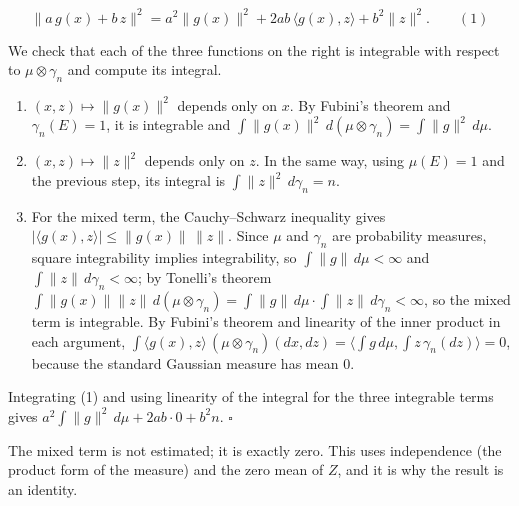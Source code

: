 \documentclass[11pt,a4paper]{report}
\begin{document}
\[\|a\,g(x)+b\,z\|^2=a^2\|g(x)\|^2+2ab\,\langle g(x),z\rangle+b^2\|z\|^2.\qquad(1)\]


We check that each of the three functions on the right is integrable with respect to \(\mu\otimes\gamma_n\) and compute its integral.



\begin{enumerate}


\item \((x,z)\mapsto\|g(x)\|^2\) depends only on \(x\). By Fubini's theorem and \(\gamma_n(E)=1\), it is integrable and \(\int\|g(x)\|^2\,d(\mu\otimes\gamma_n)=\int\|g\|^2\,d\mu\).

\item \((x,z)\mapsto\|z\|^2\) depends only on \(z\). In the same way, using \(\mu(E)=1\) and the previous step, its integral is \(\int\|z\|^2\,d\gamma_n=n\).

\item For the mixed term, the Cauchy–Schwarz inequality gives \(|\langle g(x),z\rangle|\le\|g(x)\|\,\|z\|\). Since \(\mu\) and \(\gamma_n\) are probability measures, square integrability implies integrability, so \(\int\|g\|\,d\mu<\infty\) and \(\int\|z\|\,d\gamma_n<\infty\); by Tonelli's theorem \(\int\|g(x)\|\|z\|\,d(\mu\otimes\gamma_n)=\int\|g\|\,d\mu\cdot\int\|z\|\,d\gamma_n<\infty\), so the mixed term is integrable. By Fubini's theorem and linearity of the inner product in each argument, \(\int\langle g(x),z\rangle\,(\mu\otimes\gamma_n)(dx,dz)=\bigl\langle\int g\,d\mu,\int z\,\gamma_n(dz)\bigr\rangle=0\), because the standard Gaussian measure has mean \(0\).

\end{enumerate}



Integrating (1) and using linearity of the integral for the three integrable terms gives \(a^2\int\|g\|^2\,d\mu+2ab\cdot0+b^2n\). \(\square\)




The mixed term is not estimated; it is exactly zero. This uses independence (the product form of the measure) and the zero mean of \(Z\), and it is why the result is an identity.
\end{document}
